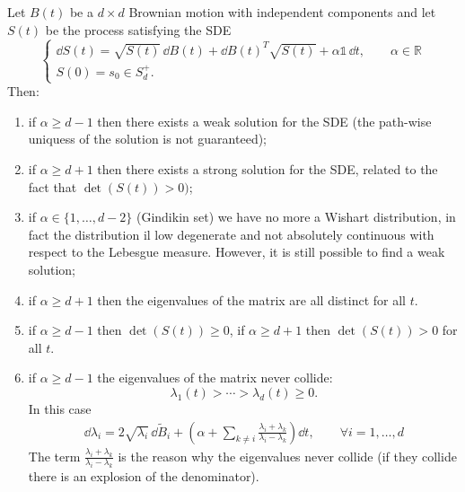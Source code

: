 \begin{theorem}
    Let $B(t)$ be a $d\times d$ Brownian motion with independent components and let $S(t)$ be the process satisfying the SDE
    \begin{equation}
    \begin{cases}
    \dd S(t) = \sqrt{S(t)}\,\dd B(t) + \dd B(t)^T\sqrt{S(t)} + \alpha\mathds{1}\,\dd t, \qquad \alpha\in\mathbb{R} \\
    S(0) = s_0 \in S_d^+.
    \end{cases}
    \end{equation}
    Then:
    \begin{enumerate}
        \item if $\alpha\ge d-1$ then there exists a weak solution for the SDE (the path-wise uniquess of the solution is not guaranteed);
        \item if $\alpha\ge d+1$ then there exists a strong solution for the SDE, related to the fact that $\det(S(t))>0)$;
        \item if $\alpha\in\{1,\dots,d-2\}$ (Gindikin set) we have no more a Wishart distribution, in fact the distribution il low degenerate and not absolutely continuous with respect to the Lebesgue measure. However, it is still possible to find a weak solution;
        \item if $\alpha\ge d+1$ then the eigenvalues of the matrix are all distinct for all $t$.
        \item if $\alpha\ge d-1$ then $\det(S(t))\ge0$, if $\alpha\ge d+1$ then $\det(S(t))>0$ for all $t$.
        \item if $\alpha\ge d-1$ the eigenvalues of the matrix never collide:
        \begin{equation*}
            \lambda_1(t) > \cdots > \lambda_d(t) \ge 0.
        \end{equation*}
        In this case
        \begin{align*}
            \dd \lambda_i = 2\sqrt{\lambda_i}\,\dd \tilde{B}_i + \left(\alpha+\sum_{k\ne i} \frac{\lambda_i + \lambda_k}{\lambda_i - \lambda_k}\right)\dd t, \qquad \forall i = 1,\dots,d
        \end{align*}
        The term $\tfrac{\lambda_i + \lambda_k}{\lambda_i - \lambda_k}$ is the reason why the eigenvalues never collide (if they collide there is an explosion of the denominator).
    \end{enumerate}
\end{theorem}

